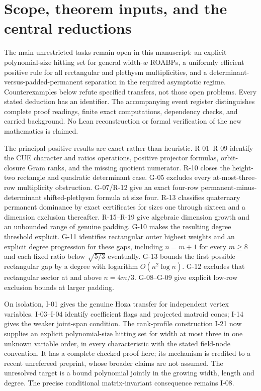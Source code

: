 \section{Scope, theorem inputs, and the central reductions}

The main unrestricted tasks remain open in this manuscript: an explicit polynomial-size hitting set for general width-$w$ ROABPs, a uniformly efficient positive rule for all rectangular and plethysm multiplicities, and a determinant-versus-padded-permanent separation in the required asymptotic regime. Counterexamples below refute specified transfers, not those open problems. Every stated deduction has an identifier. The accompanying event register distinguishes complete proof readings, finite exact computations, dependency checks, and carried background. No Lean reconstruction or formal verification of the new mathematics is claimed.

The principal positive results are exact rather than heuristic. R-01--R-09 identify the CUE character and ratios operations, positive projector formulas, orbit-closure Gram ranks, and the missing quotient numerator. R-10 closes the height-two rectangle and quadratic determinant case. G-05 excludes every at-most-three-row multiplicity obstruction. G-07/R-12 give an exact four-row permanent-minus-determinant shifted-plethysm formula at size four. R-13 classifies quaternary permanent dominance by exact certificates for sizes one through sixteen and a dimension exclusion thereafter. R-15--R-19 give algebraic dimension growth and an unbounded range of genuine padding. G-10 makes the resulting degree threshold explicit. G-11 identifies rectangular outer highest weights and an explicit degree progression for these gaps, including $n=m+1$ for every $m\geq8$ and each fixed ratio below $\sqrt{5/3}$ eventually. G-13 bounds the first possible rectangular gap by a degree with logarithm $O(n^2\log n)$. G-12 excludes that rectangular sector at and above $n=4m/3$. G-08--G-09 give explicit low-row exclusion bounds at larger padding.

On isolation, I-01 gives the genuine Hoza transfer for independent vertex variables. I-03--I-04 identify coefficient flags and projected matroid cones; I-14 gives the weaker joint-span condition. The rank-profile construction I-21 now supplies an explicit polynomial-size hitting set for width at most three in one unknown variable order, in every characteristic with the stated field-node convention. It has a complete checked proof here; its mechanism is credited to a recent unrefereed preprint, whose broader claims are not assumed. The unresolved target is a bound polynomial jointly in the growing width, length and degree. The precise conditional matrix-invariant consequence remains I-08.

